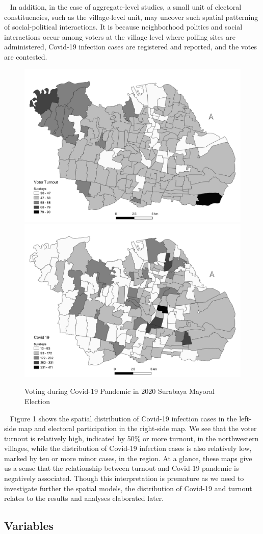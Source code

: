 \documentclass[
  12pt,
]{article}
\begin{document}
~ In addition, in the case of aggregate-level studies, a small unit of
electoral constituencies, such as the village-level unit, may uncover
such spatial patterning of social-political interactions. It is because
neighborhood politics and social interactions occur among voters at the
village level where polling sites are administered, Covid-19 infection
cases are registered and reported, and the votes are contested.

\normalsize

\begin{figure}
\includegraphics[width=0.48\linewidth]{DistVTO17Dec} \includegraphics[width=0.48\linewidth]{DistCovidDec17} \caption{Voting during Covid-19 Pandemic in 2020 Surabaya Mayoral Election}\label{fig:desctip}
\end{figure}
\normalsize

~ Figure 1 shows the spatial distribution of Covid-19 infection cases in
the left-side map and electoral participation in the right-side map. We
see that the voter turnout is relatively high, indicated by 50\% or more
turnout, in the northwestern villages, while the distribution of
Covid-19 infection cases is also relatively low, marked by ten or more
minor cases, in the region. At a glance, these maps give us a sense that
the relationship between turnout and Covid-19 pandemic is negatively
associated. Though this interpretation is premature as we need to
investigate further the spatial models, the distribution of Covid-19 and
turnout relates to the results and analyses elaborated later.

\hypertarget{variables}{%
\subsection{Variables}\label{variables}}
\end{document}
